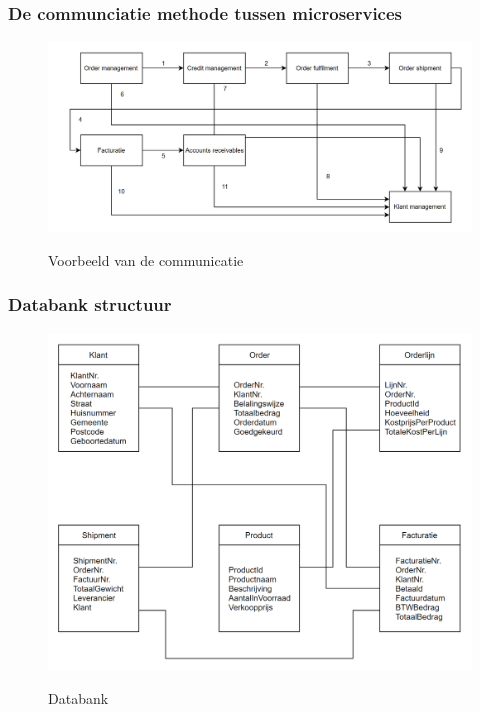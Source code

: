 \documentclass[aspectratio=169]{beamer}
\begin{document}
\begin{frame}
	\frametitle{De communciatie methode tussen microservices}
	\begin{figure}
		\caption{Voorbeeld van de communicatie}
		\includegraphics[height=.8\textheight]{img/schema_communicatie.png}
		\label{img:voorbeeldCommunicatie}
	\end{figure}
\end{frame}

\begin{frame}
	\frametitle{Databank structuur}
	\begin{figure}
		\caption{Databank}
		\includegraphics[height=.8\textheight]{img/databank.png}
		\label{img:databank}
	\end{figure}

\end{frame}
\end{document}

